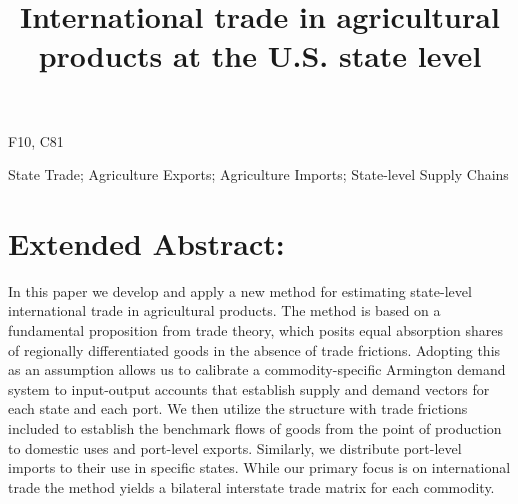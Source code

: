 \documentclass{ejb}
\begin{document}
\title{International trade in agricultural products at the
{U.S.} state level
	}            


%
\maketitle

\vspace{-30pt}
\begin{jelcodes}
F10, C81
\end{jelcodes}
\vspace{-10pt}
\begin{keywords}
State Trade; Agriculture Exports; Agriculture Imports; State-level
Supply Chains
\end{keywords}
\vspace{-10pt}
\section*{Extended Abstract:}
\vspace{-5pt}
In this paper we develop and apply a new method for estimating
state-level international trade in agricultural products.  The method
is based on a fundamental proposition from trade theory, which posits
equal absorption shares of regionally differentiated goods in the
absence of trade frictions.  Adopting this as an assumption allows us
to calibrate a commodity-specific Armington demand system to
input-output accounts that establish supply and demand vectors for
each state and each port. We then utilize the structure with trade
frictions included to establish the benchmark flows of goods from the
point of production to domestic uses and port-level exports.
Similarly, we distribute port-level imports to their use in specific
states.  While our primary focus is on international trade the method
yields a bilateral interstate trade matrix for each commodity.
\end{document}
